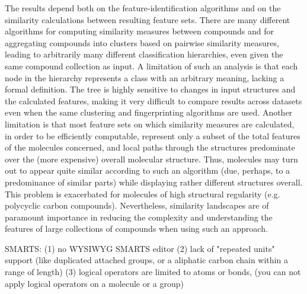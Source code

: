 \documentclass[10pt]{bmc_article}
\newenvironment{bmcformat}{\baselineskip20pt\sloppy\setboolean{publ}{false}}{\baselineskip20pt\sloppy}
\begin{document}
\begin{bmcformat}
The results depend both on the feature-identification algorithms and on the similarity calculations between resulting feature sets. There are many different algorithms for computing similarity measures between compounds and for aggregating compounds into clusters based on pairwise similarity measures, leading to arbitrarily many different classification hierarchies, even given the same compound collection as input.  A limitation of such an analysis is that each node in the hierarchy represents a class with an arbitrary meaning, lacking a formal definition.  The tree is highly sensitive to changes in input structures and the calculated features, making it very difficult to compare results across datasets even when the same clustering and fingerprinting algorithms are used. Another limitation is that most feature sets on which similarity measures are calculated, in order to be efficiently computable, represent only a subset of the total features of the molecules concerned, and local paths through the structures predominate over the (more expensive) overall molecular structure. Thus, molecules may turn out to appear quite similar according to such an algorithm (due, perhaps, to a predominance of similar parts) while displaying rather different structures overall.  This problem is exacerbated for molecules of high structural regularity (e.g. polycyclic carbon compounds).  Nevertheless, similarity landscapes are of paramount importance %
in reducing the complexity and understanding the features of large collections of compounds when using such an approach.
 

SMARTS:  (1) no WYSIWYG SMARTS editor (2) lack of "repeated units" support (like duplicated attached groups, or a aliphatic carbon chain within a range of length) (3) logical operators  are limited to atoms or bonds, (you can not apply logical operators on a molecule or a group)


\end{bmcformat}
\end{document}
